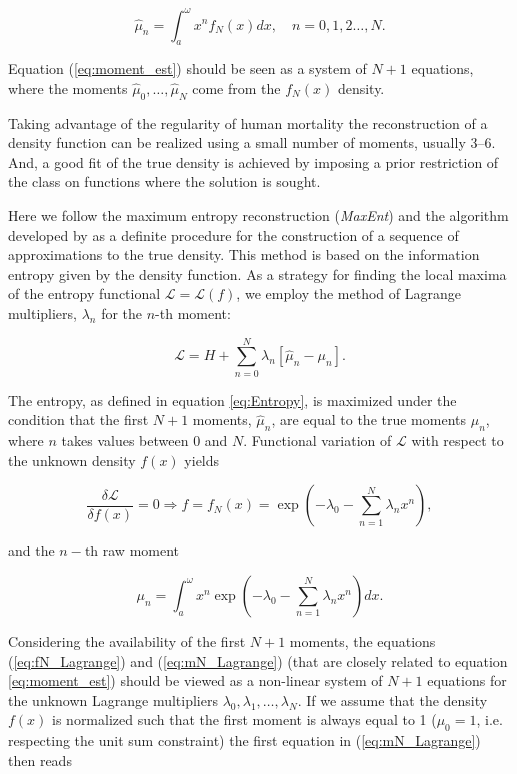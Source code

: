 \documentclass[T0_MEM]{subfiles}
\begin{document}
\begin{equation}\label{eq:moment_est}
\hat{\mu}_n = \int_{a}^{\omega} x^n f_N(x) dx, \quad n = 0, 1, 2 \dots, N.
\end{equation}

Equation (\ref{eq:moment_est}) should be seen as a system of $N+1$ equations, where the moments $\hat{\mu}_0, \dots, \hat{\mu}_N$ come from the $f_N(x)$ density.

Taking advantage of the regularity of human mortality the reconstruction of a density function can be realized using a small number of moments, usually 3--6. And, a good fit of the true density is achieved by imposing a prior restriction of the class on functions where the solution is sought.

Here we follow the maximum entropy reconstruction (\emph{MaxEnt}) and the algorithm developed by \cite{mead1984} as a definite procedure for the construction of a sequence of approximations to the true density. This method is based on the information entropy given by the density function. As a strategy for finding the local maxima of the entropy functional $\mathcal{L} = \mathcal{L}(f)$, we employ the method of Lagrange multipliers, $\lambda_n$ for the $n$-th moment:

\begin{equation}\label{eq:Lagrange}
\mathcal{L} = H + \sum_{n=0}^{N} \lambda_n \left[\hat{\mu}_n - \mu_n \right].
\end{equation}

The entropy, as defined in equation \ref{eq:Entropy}, is maximized under the condition that the first $N + 1$ moments, $\hat{\mu}_n$, are equal to the true moments $\mu_n$, where $n$ takes values between $0$ and $N$. Functional variation of $\mathcal{L}$ with respect to the unknown density $f(x)$ yields

\begin{equation}\label{eq:fN_Lagrange}
\frac{\delta\mathcal{L}}{\delta f(x)} =  0 \Longrightarrow
f = f_N(x) = \exp\left(-\lambda_0 - \sum_{n=1}^{N} \lambda_n x^n\right),
\end{equation}

and the $n-$th raw moment

\begin{equation}\label{eq:mN_Lagrange}
\mu_n = \int_{a}^{\omega} x^n \exp\left(-\lambda_0 - \sum_{n=1}^{N} \lambda_n x^n\right) dx.
\end{equation}

Considering the availability of the first $N + 1$ moments, the equations (\ref{eq:fN_Lagrange}) and (\ref{eq:mN_Lagrange}) (that are closely related to equation \ref{eq:moment_est}) should be viewed as a non-linear system of $N + 1$ equations for the unknown Lagrange multipliers $\lambda_0, \lambda_1, \dots, \lambda_N$. If we assume that the density $f(x)$ is normalized such that the first moment is always equal to 1 ($\mu_0 = 1$, i.e. respecting the unit sum constraint) the first equation in (\ref{eq:mN_Lagrange}) then reads
\end{document}
